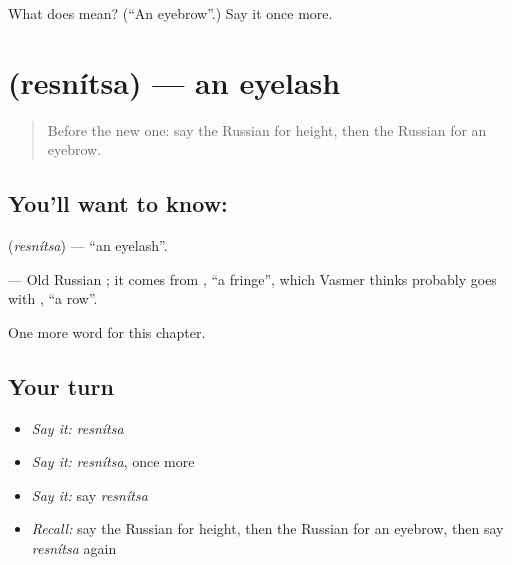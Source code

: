 \begin{tcolorbox}[breakable,colback=teal!4,colframe=teal!35!black,title={Before you move on}]
What does  mean? (\textquotedblleft{}An eyebrow\textquotedblright{}.) Say it once more.
\end{tcolorbox}
\section[\texorpdfstring{\ru{ресница} (resnítsa)}{ресница (resnítsa)}]{ (resnítsa) — an eyelash}

\label{lesson:RU-C239-resnitsa}



\begin{quote}
Before the new one: say the Russian for height, then the Russian for an eyebrow.
\end{quote}

\subsection*{You'll want to know: }
\textbf{} (\emph{resnítsa}) — \textquotedblleft{}an eyelash\textquotedblright{}.

\begin{cousinweb}
\textbf{} — Old Russian \emph{}; it comes from \emph{}, \textquotedblleft{}a fringe\textquotedblright{}, which Vasmer thinks probably goes with \emph{}, \textquotedblleft{}a row\textquotedblright{}.
\end{cousinweb}

\begin{grammarlens}[title={What you've built}]
One more word for this chapter.
\end{grammarlens}

\subsection*{Your turn}
\begin{itemize}
\raggedright
  \item \emph{Say it:} \emph{resnítsa}
  \item \emph{Say it:} \emph{resnítsa}, once more
  \item \emph{Say it:} say \emph{resnítsa}
  \item \emph{Recall:} say the Russian for height, then the Russian for an eyebrow, then say \emph{resnítsa} again
\end{itemize}

